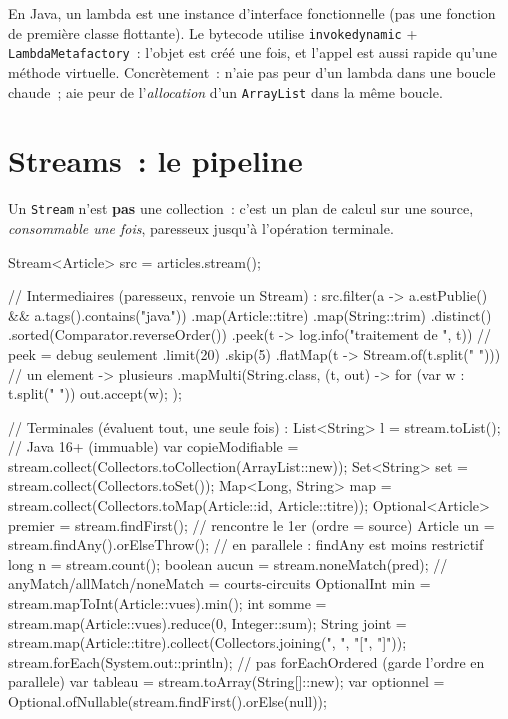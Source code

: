 \begin{note}
En Java, un lambda est une instance d'interface fonctionnelle (pas une fonction de premi\`ere
classe flottante). Le bytecode utilise \verb|invokedynamic| + \verb|LambdaMetafactory|~:
l'objet est cr\'e\'e une fois, et l'appel est aussi rapide qu'une m\'ethode virtuelle. Concr\`etement~:
n'aie pas peur d'un lambda dans une boucle chaude~; aie peur de l'\emph{allocation} d'un
\verb|ArrayList| dans la m\^eme boucle.
\end{note}

\section{Streams~: le pipeline}

Un \verb|Stream| n'est \textbf{pas} une collection~: c'est un plan de calcul sur une source,
\emph{consommable une fois}, paresseux jusqu'\`a l'op\'eration terminale.

\begin{codejava}
Stream<Article> src = articles.stream();

// Intermediaires (paresseux, renvoie un Stream) :
src.filter(a -> a.estPublie() && a.tags().contains("java"))
   .map(Article::titre)
   .map(String::trim)
   .distinct()
   .sorted(Comparator.reverseOrder())
   .peek(t -> log.info("traitement de {}", t))        // peek = debug seulement
   .limit(20)
   .skip(5)
   .flatMap(t -> Stream.of(t.split(" ")))              // un element -> plusieurs
   .mapMulti(String.class, (t, out) -> { for (var w : t.split(" ")) { out.accept(w); } });

// Terminales (\'evaluent tout, une seule fois) :
List<String> l = stream.toList();                       // Java 16+ (immuable)
var copieModifiable = stream.collect(Collectors.toCollection(ArrayList::new));
Set<String> set = stream.collect(Collectors.toSet());
Map<Long, String> map = stream.collect(Collectors.toMap(Article::id, Article::titre));
Optional<Article> premier = stream.findFirst();          // rencontre le 1er (ordre = source)
Article un = stream.findAny().orElseThrow();              // en parallele : findAny est moins restrictif
long n = stream.count();
boolean aucun = stream.noneMatch(pred);                  // anyMatch/allMatch/noneMatch = courts-circuits
OptionalInt min = stream.mapToInt(Article::vues).min();
int somme = stream.map(Article::vues).reduce(0, Integer::sum);
String joint = stream.map(Article::titre).collect(Collectors.joining(", ", "[", "]"));
stream.forEach(System.out::println);                     // pas forEachOrdered (garde l'ordre en parallele)
var tableau = stream.toArray(String[]::new);
var optionnel = Optional.ofNullable(stream.findFirst().orElse(null));
\end{codejava}

